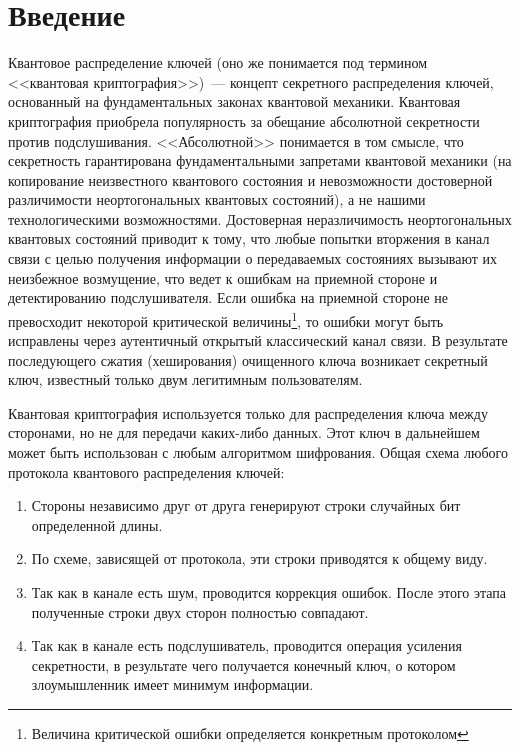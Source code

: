 \chapter*{Введение}				%
\setcounter{page}{3}

Квантовое распределение ключей (оно же понимается под термином <<квантовая криптография>>)~--- концепт секретного распределения ключей, основанный на фундаментальных законах квантовой механики.
Квантовая криптография приобрела популярность за обещание абсолютной секретности против подслушивания. <<Абсолютной>> понимается в том смысле, что секретность гарантирована
фундаментальными запретами квантовой механики (на копирование неизвестного квантового состояния и невозможности достоверной различимости неортогональных квантовых состояний), 
а не нашими технологическими возможностями. Достоверная неразличимость неортогональных квантовых состояний приводит к тому, что любые попытки вторжения в канал связи с целью получения информации о передаваемых состояниях вызывают их неизбежное возмущение, что ведет к ошибкам на приемной стороне и детектированию подслушивателя.
Если ошибка на приемной стороне не превосходит некоторой критической величины\footnote{Величина критической ошибки определяется конкретным протоколом}, то ошибки могут быть исправлены через аутентичный открытый классический канал связи. В результате последующего сжатия (хеширования) очищенного ключа возникает секретный ключ, известный только двум легитимным пользователям.

Квантовая криптография используется только для распределения ключа между сторонами, но не для передачи каких-либо данных. Этот ключ в дальнейшем может быть использован с любым алгоритмом шифрования.
Общая схема любого протокола квантового распределения ключей:
\begin{enumerate}
  \item Стороны независимо друг от друга генерируют строки случайных бит определенной длины.
  \item По схеме, зависящей от протокола, эти строки приводятся к общему виду.
  \item Так как в канале есть шум, проводится коррекция ошибок. После этого этапа полученные строки двух сторон полностью совпадают.
  \item Так как в канале есть подслушиватель, проводится операция усиления секретности, в результате чего получается конечный ключ, о котором злоумышленник имеет минимум информации.
\end{enumerate}

